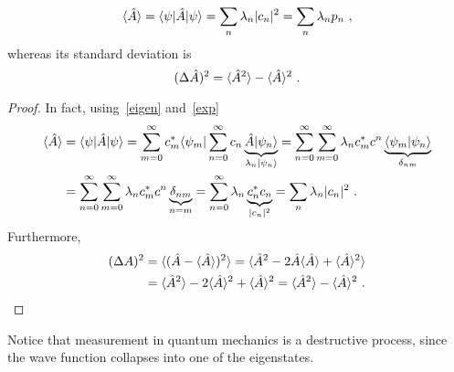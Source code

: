     \begin{equation}\label{avval}
        \langle\hat A\rangle = \langle\psi\vert \hat A \vert\psi\rangle = \sum_{n} \lambda_n |c_n|^2 = \sum_{n} \lambda_n p_n ~,
    \end{equation}
    whereas its standard deviation is 
    \begin{equation*}
        (\Delta \hat A)^2 = \langle\hat A^2\rangle - \langle\hat A\rangle^2 ~.
    \end{equation*}
    \begin{proof}
        In fact, using~\eqref{eigen} and~\eqref{exp}
        \begin{equation*}
        \begin{aligned}
            \langle\hat A\rangle & = \langle\psi\vert \hat A \vert\psi\rangle = \sum_{m=0}^{\infty} c_m^* \langle\psi_m\vert \sum_{n=0}^{\infty} c_n \underbrace{\hat A \vert\psi_n\rangle}_{\lambda_n \vert\psi_n\rangle} = \sum_{n=0}^{\infty} \sum_{m=0}^{\infty} \lambda_n c^*_m c^n \underbrace{\langle\psi_m\vert\psi_n\rangle}_{\delta_{nm}} \\ & = \sum_{n=0}^{\infty} \sum_{m=0}^{\infty} \lambda_n c^*_m c^n \underbrace{\delta_{nm}}_{n=m} = \sum_{n=0}^{\infty} \lambda_n \underbrace{c^*_n c_n}_{|c_n|^2} = \sum_{n} \lambda_n |c_n|^2 ~.
        \end{aligned}
        \end{equation*}
        Furthermore, 
        \begin{equation*}
        \begin{aligned}
            (\Delta A)^2 & = \langle(\hat A - \langle\hat A\rangle)^2\rangle = \langle\hat A^2 - 2 \hat A \langle\hat A\rangle + \langle\hat A\rangle^2\rangle \\ & = \langle\hat A^2\rangle - 2 \langle\hat A\rangle^2 + \langle\hat A\rangle^2 = \langle\hat A^2\rangle - \langle\hat A\rangle^2 ~.
        \end{aligned}
        \end{equation*}
    \end{proof}
    Notice that measurement in quantum mechanics is a destructive process, since the wave function collapses into one of the eigenstates. 

